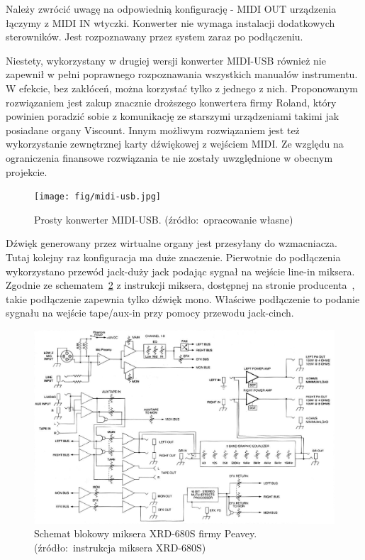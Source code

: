 \documentclass[11pt]{report}
\begin{document}
    Należy zwrócić uwagę na odpowiednią konfigurację - MIDI OUT urządzenia łączymy z MIDI IN wtyczki.
    Konwerter nie wymaga instalacji dodatkowych sterowników.
    Jest rozpoznawany przez system zaraz po podłączeniu.

    Niestety, wykorzystany w drugiej wersji konwerter MIDI-USB również nie zapewnił w pełni poprawnego rozpoznawania wszystkich manuałów instrumentu.
    W efekcie, bez zakłóceń, można korzystać tylko z jednego z nich.
    Proponowanym rozwiązaniem jest zakup znacznie droższego konwertera firmy Roland,
    który powinien poradzić sobie z komunikację ze starszymi urządzeniami takimi jak posiadane organy Viscount.
    Innym możliwym rozwiązaniem jest też wykorzystanie zewnętrznej karty dźwiękowej z wejściem MIDI.
    Ze względu na ograniczenia finansowe rozwiązania te nie zostały uwzględnione w obecnym projekcie.

    \begin{figure}[!ht]
        \centering
        \texttt{[image: fig/midi-usb.jpg]}
        \caption{Prosty konwerter MIDI-USB. (źródło:~opracowanie własne)}
        \label{fig:midiusb}
    \end{figure}

    Dźwięk generowany przez wirtualne organy jest przesyłany do wzmacniacza.
    Tutaj kolejny raz konfiguracja ma duże znaczenie.
    Pierwotnie do podłączenia wykorzystano przewód jack-duży jack podając sygnał na wejście line-in miksera.
    Zgodnie ze schematem~\ref{fig:mikser-schemat} z instrukcji miksera, dostępnej na stronie producenta~\cite{peavey}, takie podłączenie zapewnia tylko dźwięk mono.
    Właściwe podłączenie to podanie sygnału na wejście tape/aux-in przy pomocy przewodu jack-cinch.

    \begin{figure}[!ht]
        \centering
        \includegraphics[width=\linewidth]{fig/peavey.png}
        \caption{Schemat blokowy miksera XRD-680S firmy Peavey. (źródło:~instrukcja miksera XRD-680S)}
        \label{fig:mikser-schemat}
    \end{figure}
\end{document}
